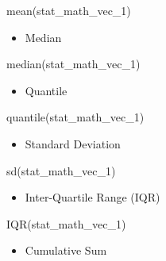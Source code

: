 \documentclass[
  letterpaper,
  DIV=11,
  numbers=noendperiod]{scrreprt}
\newenvironment{Shaded}{}{}
\newcommand{\FunctionTok}[1]{\textcolor[rgb]{0.44,0.26,0.76}{#1}}
\newcommand{\NormalTok}[1]{\textcolor[rgb]{0.14,0.16,0.18}{#1}}
\providecommand{\tightlist}{%
  \setlength{\itemsep}{0pt}\setlength{\parskip}{0pt}}\usepackage{longtable,booktabs,array}
\begin{document}
\begin{Shaded}
\begin{Highlighting}[]
\FunctionTok{mean}\NormalTok{(stat\_math\_vec\_1)}
\end{Highlighting}
\end{Shaded}

\begin{itemize}
\tightlist
\item
  Median
\end{itemize}

\begin{Shaded}
\begin{Highlighting}[]
\FunctionTok{median}\NormalTok{(stat\_math\_vec\_1)}
\end{Highlighting}
\end{Shaded}

\begin{itemize}
\tightlist
\item
  Quantile
\end{itemize}

\begin{Shaded}
\begin{Highlighting}[]
\FunctionTok{quantile}\NormalTok{(stat\_math\_vec\_1)}
\end{Highlighting}
\end{Shaded}

\begin{itemize}
\tightlist
\item
  Standard Deviation
\end{itemize}

\begin{Shaded}
\begin{Highlighting}[]
\FunctionTok{sd}\NormalTok{(stat\_math\_vec\_1)}
\end{Highlighting}
\end{Shaded}

\begin{itemize}
\tightlist
\item
  Inter-Quartile Range (IQR)
\end{itemize}

\begin{Shaded}
\begin{Highlighting}[]
\FunctionTok{IQR}\NormalTok{(stat\_math\_vec\_1)}
\end{Highlighting}
\end{Shaded}

\begin{itemize}
\tightlist
\item
  Cumulative Sum
\end{itemize}
\end{document}

